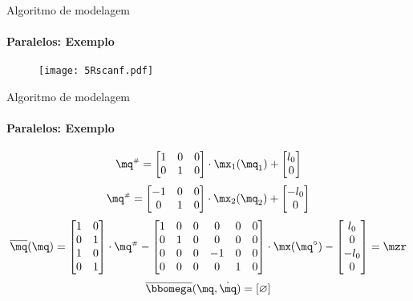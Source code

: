 \documentclass[25pt,landscape]{beamer}
\begin{document}
\begin{frame}{Algoritmo de modelagem}
    \framesubtitle{Paralelos: Exemplo}
    \pause
    \begin{figure}[!h]
        \centering
        \texttt{[image: 5Rscanf.pdf]}
    \end{figure}
\end{frame}

\begin{frame}{Algoritmo de modelagem}
    \framesubtitle{Paralelos: Exemplo}
	$$ \mq\ssh = 
\begin{bmatrix}
1 & 0 & 0 \\
0 & 1 & 0 \\
\end{bmatrix}
\cdot
\mx_1(\mq_1)
+
\begin{bmatrix}
l_0 \\
0 \\
\end{bmatrix} $$
$$ \mq\ssh = 
\begin{bmatrix}
-1 & 0 & 0 \\
0 & 1 & 0 \\
\end{bmatrix}
\cdot
\mx_2(\mq_2)
+
\begin{bmatrix}
-l_0 \\
0 \\
\end{bmatrix} $$
\pause
$$ \overline{\mq}(\mq) =
\begin{bmatrix}
1 & 0 \\
0 & 1 \\
1 & 0 \\
0 & 1 \\
\end{bmatrix}
\cdot
\mq\ssh
-
\begin{bmatrix}
1 & 0 & 0 & 0 & 0 & 0 \\
0 & 1 & 0 & 0 & 0 & 0 \\
0 & 0 & 0 & -1 & 0 & 0 \\
0 & 0 & 0 & 0 & 1 & 0 \\
\end{bmatrix}
\cdot
\mx(\mq\cir)
-
\begin{bmatrix}
l_0 \\
0 \\
-l_0 \\
0 \\
\end{bmatrix}
= \mzr $$
\pause
$$ \overline{\momega}(\mq, \dot{\mq}) = \vct{\varnothing} $$    
\end{frame}
\end{document}
